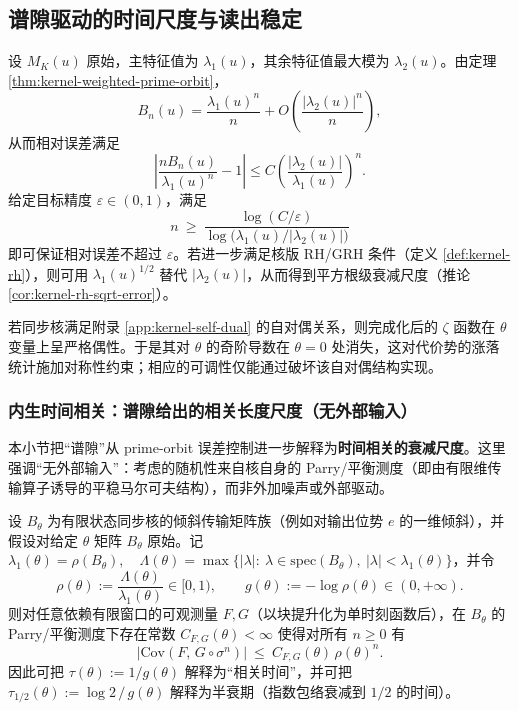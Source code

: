 \subsection{谱隙驱动的时间尺度与读出稳定}\label{subsec:pom-spectral-gap}
\begin{corollary}[谱隙控制的读出时间尺度]\label{cor:pom-spectral-gap-time}
设 $M_K(u)$ 原始，主特征值为 $\lambda_1(u)$，其余特征值最大模为 $\lambda_2(u)$。由定理 \ref{thm:kernel-weighted-prime-orbit}，
\[
B_n(u)=\frac{\lambda_1(u)^n}{n}+O\!\left(\frac{|\lambda_2(u)|^n}{n}\right),
\]
从而相对误差满足
\[
\left|\frac{nB_n(u)}{\lambda_1(u)^n}-1\right|
\le C\left(\frac{|\lambda_2(u)|}{\lambda_1(u)}\right)^n.
\]
给定目标精度 $\varepsilon\in(0,1)$，满足
\[
n\ \ge\ \frac{\log(C/\varepsilon)}{\log\!\bigl(\lambda_1(u)/|\lambda_2(u)|\bigr)}
\]
即可保证相对误差不超过 $\varepsilon$。若进一步满足核版 RH/GRH 条件（定义 \ref{def:kernel-rh}），则可用 $\lambda_1(u)^{1/2}$ 替代 $|\lambda_2(u)|$，从而得到平方根级衰减尺度（推论 \ref{cor:kernel-rh-sqrt-error}）。
\end{corollary}

\begin{remark}[自对偶与完成化偶性]\label{rem:pom-duality-even}
若同步核满足附录 \ref{app:kernel-self-dual} 的自对偶关系，则完成化后的 $\zeta$ 函数在 $\theta$ 变量上呈严格偶性。于是其对 $\theta$ 的奇阶导数在 $\theta=0$ 处消失，这对代价势的涨落统计施加对称性约束；相应的可调性仅能通过破坏该自对偶结构实现。
\end{remark}

\subsubsection{内生时间相关：谱隙给出的相关长度尺度（无外部输入）}

本小节把“谱隙”从 prime-orbit 误差控制进一步解释为\textbf{时间相关的衰减尺度}。这里强调“无外部输入”：考虑的随机性来自核自身的 Parry/平衡测度（即由有限维传输算子诱导的平稳马尔可夫结构），而非外加噪声或外部驱动。

\begin{proposition}[谱隙 \texorpdfstring{$\Rightarrow$}{=>} 时间相关指数衰减（可审计）]\label{prop:pom-time-corr-gap}
设 $B_\theta$ 为有限状态同步核的倾斜传输矩阵族（例如对输出位势 $e$ 的一维倾斜），并假设对给定 $\theta$ 矩阵 $B_\theta$ 原始。记
\(
\lambda_1(\theta)=\rho(B_\theta),\quad
\Lambda(\theta)=\max\{ |\lambda|:\ \lambda\in\mathrm{spec}(B_\theta),\ |\lambda|<\lambda_1(\theta)\}
\)，并令
\[
\rho(\theta):=\frac{\Lambda(\theta)}{\lambda_1(\theta)}\in[0,1),
\qquad
g(\theta):=-\log \rho(\theta)\in(0,+\infty).
\]
则对任意依赖有限窗口的可观测量 $F,G$（以块提升化为单时刻函数后），在 $B_\theta$ 的 Parry/平衡测度下存在常数 $C_{F,G}(\theta)<\infty$ 使得对所有 $n\ge 0$ 有
\[
\bigl|\mathrm{Cov}(F,\,G\circ\sigma^n)\bigr|\ \le\ C_{F,G}(\theta)\,\rho(\theta)^n.
\]
因此可把
\(
\tau(\theta):=1/g(\theta)
\)
解释为“相关时间”，并可把 $\tau_{1/2}(\theta):=\log 2\,/\,g(\theta)$ 解释为半衰期（指数包络衰减到 $1/2$ 的时间）。
\end{proposition}

